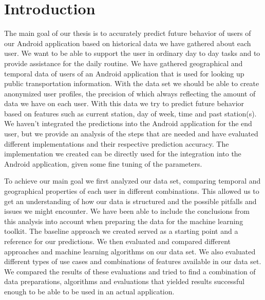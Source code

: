 \newpage
\chapter{Introduction}
The main goal of our thesis is to accurately predict future behavior of users of our Android application based on historical data we have gathered about each user. We want to be able to support the user in ordinary day to day tasks and to provide assistance for the daily routine. We have gathered geographical and temporal data of users of an Android application that is used for looking up public transportation information. With the data set we should be able to create anonymized user profiles, the precision of which always reflecting the amount of data we have on each user. With this data we try to predict future behavior based on features such as current station, day of week, time and past station(s). We haven't integrated the predictions into the Android application for the end user, but we provide an analysis of the steps that are needed and have evaluated different implementations and their respective prediction accuracy. The implementation we created can be directly used for the integration into the Android application, given some fine tuning of the parameters.

To achieve our main goal we first analyzed our data set, comparing temporal and geographical properties of each user in different combinations. This allowed us to get an understanding of how our data is structured and the possible pitfalls and issues we might encounter. We have been able to include the conclusions from this analysis into account when preparing the data for the machine learning toolkit. The baseline approach we created served as a starting point and a reference for our predictions. We then evaluated and compared different approaches and machine learning algorithms on our data set. We also evaluated different types of use cases and combinations of features available in our data set. We compared the results of these evaluations and tried to find a combination of data preparations, algorithms and evaluations that yielded results successful enough to be able to be used in an actual application. 

